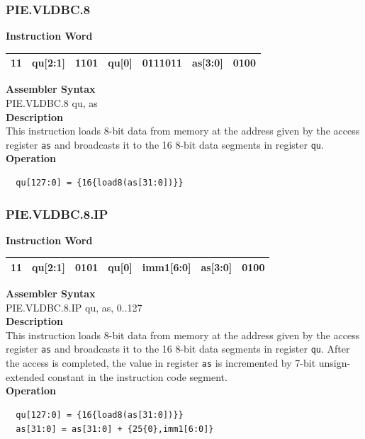 \newpage
\subsubsection{PIE.VLDBC.8}\label{instruction:PIEVLDBC8}
\setlength\tabcolsep{6pt}
\textbf{Instruction Word} \\
\begin{tabular}{|c|c|c|c|c|c|c|}
	\hline
	11 & qu[2:1] & 1101 & qu[0] & 0111011 & as[3:0] & 0100 \\
	\hline
\end{tabular}

\textbf{Assembler Syntax} \\
PIE.VLDBC.8 qu, as \\
\textbf{Description} \\
This instruction loads 8-bit data from memory at the address given by the access register \lstinline{as} and broadcasts it to the 16 8-bit data segments in register \lstinline{qu}.\\
\textbf{Operation}
\begin{lstlisting}
  qu[127:0] = {16{load8(as[31:0])}}
\end{lstlisting}

\newpage
\subsubsection{PIE.VLDBC.8.IP}\label{instruction:PIEVLDBC8IP}
\setlength\tabcolsep{6pt}
\textbf{Instruction Word} \\
\begin{tabular}{|c|c|c|c|c|c|c|}
	\hline
	11 & qu[2:1] & 0101 & qu[0] & imm1[6:0] & as[3:0] & 0100 \\
	\hline
\end{tabular}

\textbf{Assembler Syntax} \\
PIE.VLDBC.8.IP qu, as, 0..127 \\
\textbf{Description} \\
This instruction loads 8-bit data from memory at the address given by the access register \lstinline{as} and broadcasts it to the 16 8-bit data segments in register \lstinline{qu}. After the access is completed, the value in register \lstinline{as} is incremented by 7-bit unsign-extended constant in the instruction code segment.\\
\textbf{Operation}
\begin{lstlisting}
  qu[127:0] = {16{load8(as[31:0])}}
  as[31:0] = as[31:0] + {25{0},imm1[6:0]}
\end{lstlisting}

